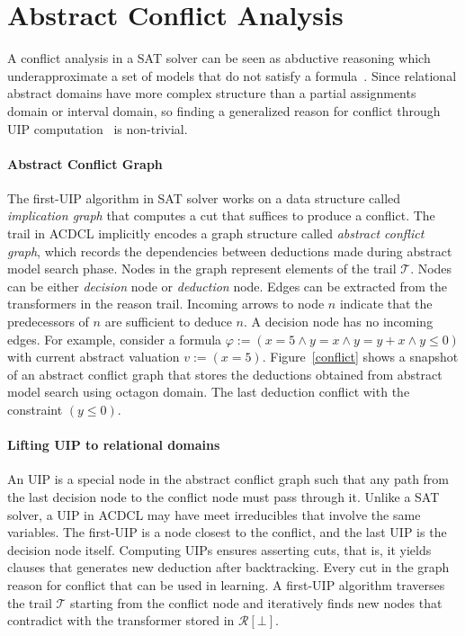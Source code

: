 \section{Abstract Conflict Analysis}
A conflict analysis in a SAT solver can be seen as abductive 
reasoning which underapproximate a set of models that do not satisfy a 
formula~\cite{sas12,dhk2013-popl}.  
Since relational abstract domains have more complex structure than a partial 
assignments domain or interval domain, so finding a generalized reason for 
conflict through UIP computation~\cite{uip} is non-trivial. 

\paragraph {\textbf{Abstract Conflict Graph}}
The first-UIP algorithm in SAT solver works on a data structure called 
{\em implication graph} that computes a cut that suffices to produce a 
conflict.  The trail in ACDCL implicitly encodes a graph structure called 
{\em abstract conflict graph}, which records the dependencies between 
deductions made during abstract model search phase.  Nodes in the graph 
represent elements of the trail $\mathcal{T}$.  Nodes can be either 
{\em decision} node or {\em deduction} node. Edges can be extracted from
the transformers in the reason trail.  Incoming arrows to node $n$ 
indicate that the predecessors of $n$ are sufficient to deduce $n$.  
A decision node has no incoming edges.  
For example, consider a formula 
$\varphi:= (x=5 \wedge y=x \wedge y=y+x \wedge y \leq 0)$ with current 
abstract valuation $v:= (x=5)$.  Figure~\ref{conflict} shows a 
snapshot of an abstract conflict graph that 
stores the deductions obtained from abstract model search using octagon domain.  
The last deduction conflict with the constraint $(y \leq 0)$.  

\paragraph {\textbf{Lifting UIP to relational domains}}
An UIP is a special node in the abstract conflict graph such that 
any path from the last decision node to the conflict node must pass 
through it.  Unlike a SAT solver, a UIP in ACDCL may have meet irreducibles 
that involve the same variables.  The first-UIP is a node closest  to the 
conflict, and the last UIP is the decision node itself.  Computing UIPs ensures 
asserting cuts, that is, it yields clauses that generates new deduction after 
backtracking.  Every cut in the graph reason for conflict that can be used in learning.  
A first-UIP algorithm traverses the trail $\mathcal{T}$ starting from the 
conflict node and iteratively finds new nodes that contradict  with the 
transformer stored in $\mathcal{R}[\bot]$.  

